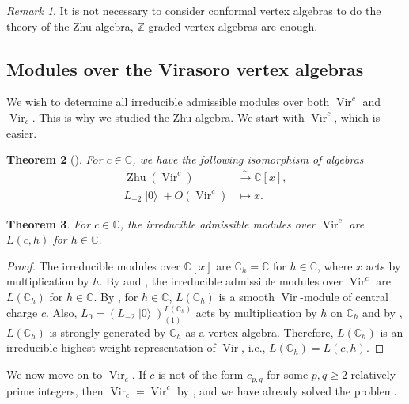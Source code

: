 \documentclass[a4paper, 12pt, reqno]{amsart}
\newtheorem{theorem}{Theorem}[section]
\theoremstyle{remark}
\newtheorem{remark}[theorem]{Remark}
\DeclareMathOperator{\Vir}{Vir}
\DeclareMathOperator{\vac}{|0\rangle}
\DeclareMathOperator{\Zhu}{Zhu}
\begin{document}
\begin{remark}
  \label{rmk:36}
  It is not necessary to consider conformal vertex algebras to do the theory of the Zhu algebra, $\mathbb{Z}$-graded vertex algebras are enough.
\end{remark}

\subsection{Modules over the Virasoro vertex algebras}
\label{sec:modul-over-viras}

We wish to determine all irreducible admissible modules over both $\Vir^c$ and $\Vir_c$.
This is why we studied the Zhu algebra.
We start with $\Vir^c$, which is easier.

\begin{theorem}[{\cite{wang_rationality_1993}}]
  \label{thr:41}
  For $c \in \mathbb{C}$, we have the following isomorphism of algebras
  \begin{align*}
    \Zhu(\Vir^c) &\xrightarrow{\sim} \mathbb{C}[x], \\
    L_{-2}\vac + O(\Vir^c) &\mapsto x.
  \end{align*}
\end{theorem}

\begin{theorem}
  \label{thr:42}
  For $c \in \mathbb{C}$, the irreducible admissible modules over $\Vir^c$ are $L(c, h)$ for $h \in \mathbb{C}$.
\end{theorem}

\begin{proof}
  The irreducible modules over $\mathbb{C}[x]$ are $\mathbb{C}_h = \mathbb{C}$ for $h \in \mathbb{C}$, where $x$ acts by multiplication by $h$.
  By  and , the irreducible admissible modules over $\Vir^c$ are $L(\mathbb{C}_h)$ for $h \in \mathbb{C}$.
  By , for $h \in \mathbb{C}$, $L(\mathbb{C}_h)$ is a smooth $\Vir$-module of central charge $c$.
  Also, $L_0 = (L_{-2}\vac)^{L(\mathbb{C}_h)}_{(1)}$ acts by multiplication by $h$ on $\mathbb{C}_h$ and by , $L(\mathbb{C}_h)$ is strongly generated by $\mathbb{C}_h$ as a vertex algebra.
  Therefore, $L(\mathbb{C}_h)$ is an irreducible highest weight representation of $\Vir$, i.e., $L(\mathbb{C}_h) = L(c, h)$.
\end{proof}

We now move on to $\Vir_c$.
If $c$ is not of the form $c_{p, q}$ for some $p, q \ge 2$ relatively prime integers, then $\Vir_c = \Vir^c$ by , and we have already solved the problem.
\end{document}
